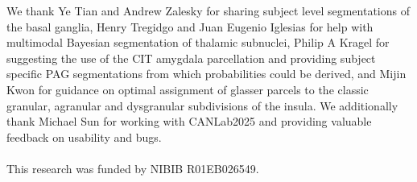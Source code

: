 \documentclass[10pt,letterpaper]{article}
\begin{document}
We thank Ye Tian and Andrew Zalesky for sharing subject level segmentations of the basal ganglia, Henry Tregidgo and Juan Eugenio Iglesias for help with multimodal Bayesian segmentation of thalamic subnuclei, Philip A Kragel for suggesting the use of the CIT amygdala parcellation and providing subject specific PAG segmentations from which probabilities could be derived, and Mijin Kwon for guidance on optimal assignment of glasser parcels to the classic granular, agranular and dysgranular subdivisions of the insula. We additionally thank Michael Sun for working with CANLab2025 and providing valuable feedback on usability and bugs.
\\
\\
This research was funded by NIBIB R01EB026549.



\setlength{\bibleftmargin}{.125in}
\setlength{\bibindent}{-\bibleftmargin}


\end{document}

